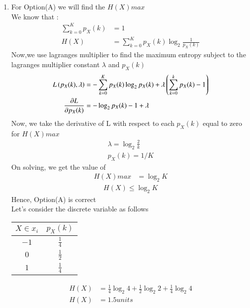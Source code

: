 \documentclass[journal,12pt,onecolumn]{IEEEtran}
\theoremstyle{remark}
\begin{document}
\begin{enumerate}
\item For Option(A) we will find the $H(X)max$ \\
We know that :
\begin{align}
\sum_{k=0}^{K}p_X(k) &= 1\\
 H(X) &= \sum_{k=0}^{K}p_X(k) \log _{2} \frac{1}{p_X(k)}
 \end{align}
 Now,we use lagranges multiplier to find the maximum entropy subject to the lagranges multiplier constant 
$\lambda$ and $p_X(k)$
\begin{align}
L\left(p_X(k),\lambda\right) &= -\sum_{k = 0}^{K}p_X(k) \log _{2}p_X(k) + \lambda\left(\sum_{k = 0}^{k}p_X(k) - 1\right)\\
\frac{\partial L}{\partial p_X(k)} &= -\log _{2}p_X(k) -1 + \lambda
\end{align}
Now, we take the derivative of L with respect to each $p_X(k)$ equal to zero for $H(X)max$
\begin{align}
\lambda = \log _{2}\frac{2}{k}\\
p_X(k) = 1/K
\end{align}
 On solving, we get the value of 
 \begin{align}
 H(X)max &= \log _{2}K 
 \end{align}
 \begin{align}
 H(X) \leq \log _{2}K 
 \end{align}
 Hence, Option(A) is correct\\
Let's consider the discrete variable as follows
 \begin{table}[htpb]
\centering 
\begin{tabular}{|c|c|}
\hline
$X \in x_i$	&	$p_X(k)$\\
\hline
$-1$                         & $\frac{1}{4} $ \\
\hline
$0$                         & $\frac{1}{2}$  \\
\hline
$1$                         & $\frac{1}{4} $ \\
\hline
\end{tabular}
\end{table}
\begin{align}
H(X) &= \frac{1}{4}\log _{2}4 + \frac{1}{2}\log _{2}2 +\frac{1}{4}\log _{2}4\\
H(X) &=  1.5 units

\end{align}
\end{enumerate}
\end{document}
